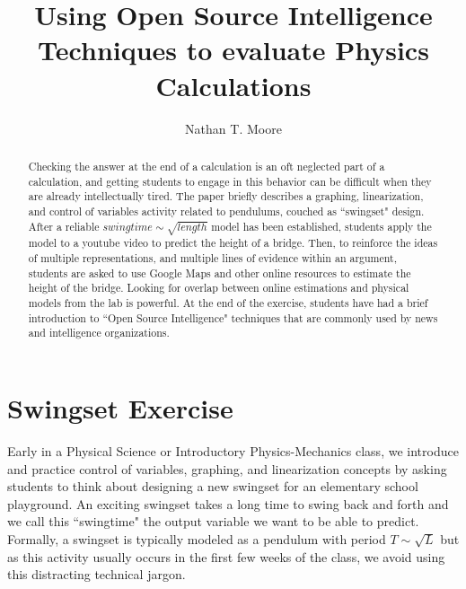\documentclass[12pt]{iopart}
\begin{document}
\title[Using Open Source Intelligence Techniques to evaluate Physics Calculations]{Using Open Source Intelligence Techniques to evaluate Physics Calculations}

\author{Nathan T. Moore}

\address{
	Physics and General Engineering, 
	Winona State University,
	Winona, MN 55987 USA
}
\vspace{10pt}
\begin{indented}
\item[\today]
\end{indented}

\begin{abstract}
Checking the answer at the end of a calculation is an oft neglected part of a calculation, and getting students to engage in this behavior can be difficult when they are already intellectually tired. 
	The paper briefly describes a graphing, linearization, and control of variables activity related to pendulums, couched as ``swingset" design. 
	After a reliable $swingtime \sim \sqrt{length}$ model has been established, students apply the model to a youtube video to predict the height of a bridge. 
	Then, to reinforce the ideas of multiple representations, and multiple lines of evidence within an argument, students are asked to use Google Maps and other online resources to estimate the height of the bridge. 
	Looking for overlap between online estimations and physical models from the lab is powerful. 
	At the end of the exercise, students have had a brief introduction to ``Open Source Intelligence" techniques that are commonly used by news and intelligence organizations. 
\end{abstract}

%
%
%
% 
%



\section{Swingset Exercise}
Early in a Physical Science or Introductory Physics-Mechanics class, we introduce and practice control of variables, graphing, and linearization concepts by asking students to think about designing a new swingset for an elementary school playground.  
An exciting swingset takes a long time to swing back and forth and we call this ``swingtime" the output variable we want to be able to predict.
Formally, a swingset is typically modeled as a pendulum with period 
$T \sim \sqrt{L}$ \cite{openstax_pendulum} but as this activity usually occurs in the first few weeks of the class, we avoid using this distracting technical jargon.
\end{document}
